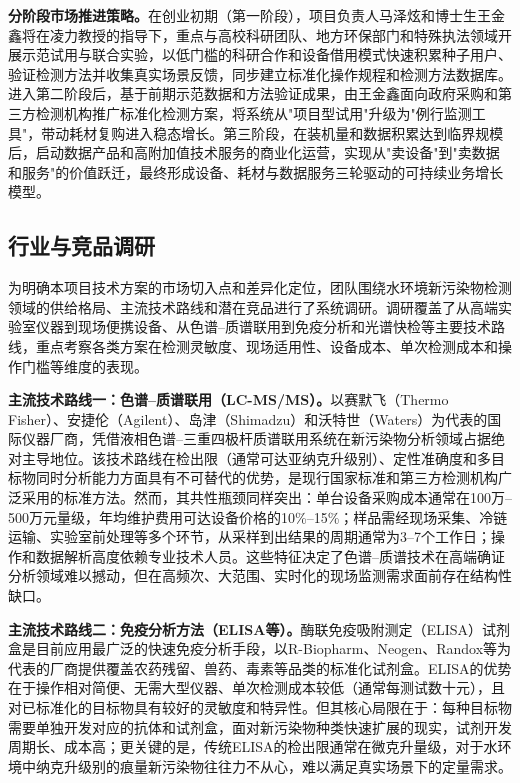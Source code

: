\documentclass[12pt,a4paper]{article}
\begin{document}
\textbf{分阶段市场推进策略。}在创业初期（第一阶段），项目负责人马泽炫和博士生王金鑫将在凌力教授的指导下，重点与高校科研团队、地方环保部门和特殊执法领域开展示范试用与联合实验，以低门槛的科研合作和设备借用模式快速积累种子用户、验证检测方法并收集真实场景反馈，同步建立标准化操作规程和检测方法数据库。进入第二阶段后，基于前期示范数据和方法验证成果，由王金鑫面向政府采购和第三方检测机构推广标准化检测方案，将系统从"项目型试用"升级为"例行监测工具"，带动耗材复购进入稳态增长。第三阶段，在装机量和数据积累达到临界规模后，启动数据产品和高附加值技术服务的商业化运营，实现从"卖设备"到"卖数据和服务"的价值跃迁，最终形成设备、耗材与数据服务三轮驱动的可持续业务增长模型。

\subsection{行业与竞品调研}

为明确本项目技术方案的市场切入点和差异化定位，团队围绕水环境新污染物检测领域的供给格局、主流技术路线和潜在竞品进行了系统调研。调研覆盖了从高端实验室仪器到现场便携设备、从色谱--质谱联用到免疫分析和光谱快检等主要技术路线，重点考察各类方案在检测灵敏度、现场适用性、设备成本、单次检测成本和操作门槛等维度的表现。

\textbf{主流技术路线一：色谱--质谱联用（LC-MS/MS）。}以赛默飞（Thermo Fisher）、安捷伦（Agilent）、岛津（Shimadzu）和沃特世（Waters）为代表的国际仪器厂商，凭借液相色谱--三重四极杆质谱联用系统在新污染物分析领域占据绝对主导地位。该技术路线在检出限（通常可达亚纳克升级别）、定性准确度和多目标物同时分析能力方面具有不可替代的优势，是现行国家标准和第三方检测机构广泛采用的标准方法。然而，其共性瓶颈同样突出：单台设备采购成本通常在100万--500万元量级，年均维护费用可达设备价格的10\%--15\%；样品需经现场采集、冷链运输、实验室前处理等多个环节，从采样到出结果的周期通常为3--7个工作日；操作和数据解析高度依赖专业技术人员。这些特征决定了色谱--质谱技术在高端确证分析领域难以撼动，但在高频次、大范围、实时化的现场监测需求面前存在结构性缺口。

\textbf{主流技术路线二：免疫分析方法（ELISA等）。}酶联免疫吸附测定（ELISA）试剂盒是目前应用最广泛的快速免疫分析手段，以R-Biopharm、Neogen、Randox等为代表的厂商提供覆盖农药残留、兽药、毒素等品类的标准化试剂盒。ELISA的优势在于操作相对简便、无需大型仪器、单次检测成本较低（通常每测试数十元），且对已标准化的目标物具有较好的灵敏度和特异性。但其核心局限在于：每种目标物需要单独开发对应的抗体和试剂盒，面对新污染物种类快速扩展的现实，试剂开发周期长、成本高；更关键的是，传统ELISA的检出限通常在微克升量级，对于水环境中纳克升级别的痕量新污染物往往力不从心，难以满足真实场景下的定量需求。
\end{document}
